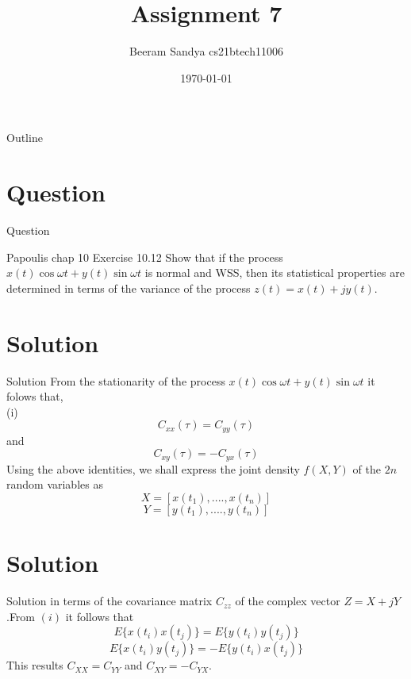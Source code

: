 \documentclass{beamer}
\title{Assignment 7}
\author{Beeram Sandya cs21btech11006}
\date{\today}
\begin{document}
\begin{frame}
    \titlepage 
\end{frame}

\logo{}


\begin{frame}{Outline}
    \tableofcontents
\end{frame}


\section{Question}
\begin{frame}{Question}
\begin{block}{Papoulis chap 10 Exercise 10.12}
Show that if the process $x(t)\cos\omega t + y(t)\sin\omega t $ is normal and WSS, then its statistical properties are determined in terms of the variance of the process $z(t) = x(t) + jy(t)$.
\end{block}
\end{frame}


\section{Solution}
\begin{frame}{Solution}
From the stationarity of the process $x(t)\cos\omega t + y(t)\sin\omega t $ it folows that,\\
(i)\[ C_{xx}(\tau)=C_{yy}(\tau)\]and \[C_{xy}(\tau)=-C_{yx}(\tau)\]  
Using the above identities, we shall express the joint density $f(X,Y)$ of the $2n$ random variables as
\[X=[x(t_1),....,x(t_n)]\]
\[Y=[y(t_1),....,y(t_n)]\]

\end{frame} 

\section{Solution}
\begin{frame}{Solution}
in terms of the covariance matrix $C_{zz}$ of the complex vector $Z=X+jY$.From $(i)$
it follows that 
\[E\{x(t_i)x(t_j)\}=E\{y(t_i)y(t_j)\}\] 
\[E\{x(t_i)y(t_j)\}=-E\{y(t_i)x(t_j)\}\]
This results $C_{XX}=C_{YY}$ and $C_{XY}=-C_{YX}$.
\end{frame} 
\end{document}
